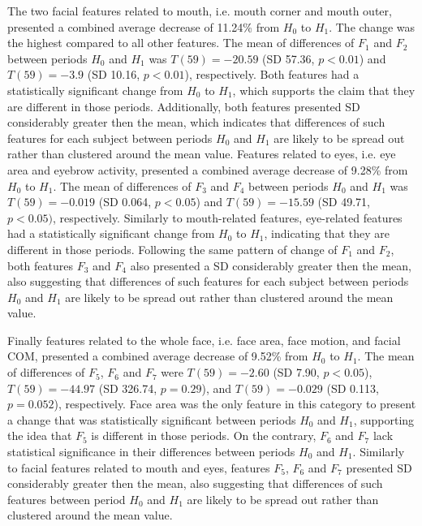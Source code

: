The two facial features related to mouth, i.e. mouth corner and mouth outer, presented a combined average decrease of 11.24\% from $H_0$ to $H_1$. The change was the highest compared to all other features. The mean of differences of $F_1$ and $F_2$ between periods $H_0$ and $H_1$ was $T(59) = -20.59$ (SD 57.36, $p < 0.01$) and $T(59) = -3.9$ (SD 10.16, $p < 0.01$), respectively. Both features had a statistically significant change from $H_0$ to $H_1$, which supports the claim that they are different in those periods. Additionally, both features presented SD considerably greater then the mean, which indicates that differences of such features for each subject between periods $H_0$ and $H_1$ are likely to be spread out rather than clustered around the mean value.
Features related to eyes, i.e. eye area and eyebrow activity, presented a combined average decrease of 9.28\% from $H_0$ to $H_1$. The mean of differences of $F_3$ and $F_4$ between periods $H_0$ and $H_1$ was $T(59) = -0.019$ (SD 0.064, $p < 0.05$) and $T(59) = -15.59$ (SD 49.71, $p < 0.05)$, respectively. Similarly to mouth-related features, eye-related features had a statistically significant change from $H_0$ to $H_1$, indicating that they are different in those periods. Following the same pattern of change of $F_1$ and $F_2$, both features $F_3$ and $F_4$ also presented a SD considerably greater then the mean, also suggesting that differences of such features for each subject between periods $H_0$ and $H_1$ are likely to be spread out rather than clustered around the mean value.

Finally features related to the whole face, i.e. face area, face motion, and facial COM, presented a combined average decrease of 9.52\% from $H_0$ to $H_1$. The mean of differences of $F_5$, $F_6$ and $F_7$ were $T(59) = -2.60$ (SD 7.90, $p < 0.05$), $T(59) = -44.97$ (SD 326.74, $p = 0.29$), and $T(59) = -0.029$ (SD 0.113, $p = 0.052$), respectively. Face area was the only feature in this category to present a change that was statistically significant between periods $H_0$ and $H_1$, supporting the idea that $F_5$ is different in those periods. On the contrary, $F_6$ and $F_7$ lack statistical significance in their differences between periods $H_0$ and $H_1$. Similarly to facial features related to mouth and eyes, features $F_5$, $F_6$ and $F_7$ presented SD considerably greater then the mean, also suggesting that differences of such features between period $H_0$ and $H_1$ are likely to be spread out rather than clustered around the mean value.

